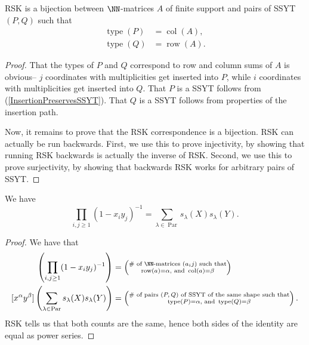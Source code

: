 \documentclass{article}
\DeclareMathOperator{\row}{row}
\DeclareMathOperator{\col}{col}
\DeclareMathOperator{\type}{type}
\DeclareMathOperator{\Par}{Par}
\begin{document}
\begin{theorem}
    RSK is a bijection between $\NN$-matrices $A$ of finite support and pairs of SSYT $(P,Q)$ such that
    \begin{align*}
        \type(P) &= \col(A), \\
        \type(Q) &= \row(A).
    \end{align*}
\end{theorem}

\begin{proof}
    That the types of $P$ and $Q$ correspond to row and column sums of $A$ is obvious-- $j$ coordinates with multiplicities get inserted into $P$, while $i$ coordinates with multiplicities get inserted into $Q$.
    That $P$ is a SSYT follows from (\ref{InsertionPreservesSSYT}).
    That $Q$ is a SSYT follows from properties of the insertion path.

    Now, it remains to prove that the RSK correspondence is a bijection. 
    RSK can actually be run backwards. 
    First, we use this to prove injectivity, by showing that running RSK backwards is actually the inverse of RSK. 
    Second, we use this to prove surjectivity, by showing that backwards RSK works for arbitrary pairs of SSYT.

\end{proof}


\begin{theorem}    We have
    \begin{equation}\label{eq:CauchyIdentityForSchurs}
        \prod_{i,j \geq 1}(1-x_iy_j)^{-1} = \sum_{\lambda \in \Par}s_\lambda(X) s_\lambda(Y).     
    \end{equation}
\end{theorem}

\begin{proof}
    We have that
    \begin{align*}
        [x^\alpha y^\beta]\left(\prod_{i,j\geq1}(1-x_iy_j)^{-1}\right) &= \left(\substack{\#\text{ of $\NN$-matrices $(a_ij)$ such that}\\\row(a) = \alpha\text{, and }\col(a) = \beta}\right) \\
        [x^\alpha y^\beta]\left(\sum_{\lambda\in\Par} s_\lambda(X) s_\lambda(Y) \right) &= \left(\substack{\#\text{ of pairs $(P,Q)$ of SSYT of the same shape such that}\\\type(P) = \alpha\text{, and }\type(Q) = \beta}\right).
    \end{align*}
    RSK tells us that both counts are the same, hence both sides of the identity are equal as power series.
\end{proof}
\end{document}
